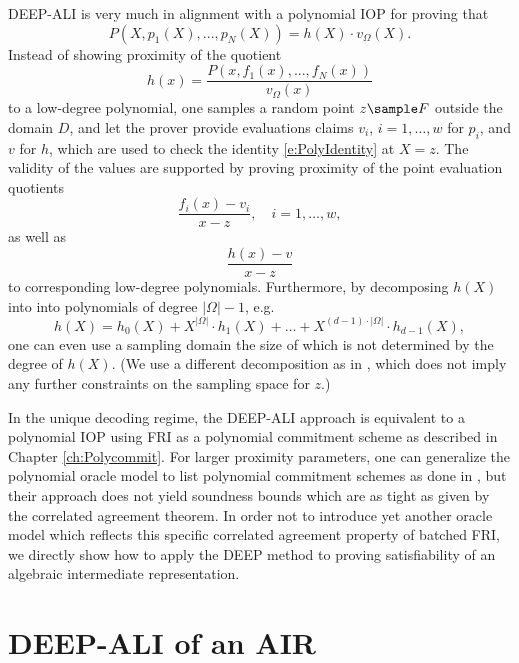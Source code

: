 \documentclass[11pt,article,oneside]{memoir}
\theoremstyle{definition}
\theoremstyle{remark}
\begin{document}
DEEP-ALI is very much in alignment with a polynomial IOP for proving that
\begin{equation}
\label{e:PolyIdentity}
P(X,p_1(X),..., p_N(X)) = h(X)\cdot v_\Omega(X). 
\end{equation}
Instead of showing proximity of the quotient
\[
h(x) = \frac{P(x,f_1(x),..., f_N(x))}{v_\Omega(x)}
\]
to a low-degree polynomial, one samples a random point $z\sample F$ outside the domain $D$, and let the prover provide evaluations claims $v_i$, $i=1,\ldots,w$ for $p_i$, and $v$ for $h$, which are used to check the identity \eqref{e:PolyIdentity} at $X=z$.
The validity of the values are supported by proving proximity of the point evaluation quotients
\[
\frac{f_i(x)-v_i}{x-z}, \quad i=1,\ldots ,w,
\]
as well as
\[
\frac{h(x)-v}{x-z}
\]
to corresponding low-degree polynomials.
Furthermore, by decomposing $h(X)$ into into polynomials of degree $|\Omega|-1$, e.g.
\begin{equation}
\label{e:SegmentPolys}
h(X)=h_0(X)+X^{|\Omega|}\cdot h_1(X)+ \ldots +X^{(d-1)\cdot |\Omega|}\cdot  h_{d-1}(X),
\end{equation}
one can even use a sampling domain the size of which is not determined by the degree of $h(X)$. 
(We use a different decomposition as in \cite{DEEPFRI, ethSTARK}, which does not imply any further constraints on the sampling space for $z$.)

In the unique decoding regime, the DEEP-ALI approach is equivalent to a polynomial IOP using FRI as a polynomial commitment scheme as described in Chapter \ref{ch:Polycommit}. 
For larger proximity parameters, one can generalize the polynomial oracle model to list polynomial commitment schemes as done in \cite{Redshift}, but their approach does not yield soundness bounds which are as tight as given by the correlated agreement theorem. 
In order not to introduce yet another oracle model which reflects this specific correlated agreement property of batched FRI, we directly show how to apply the DEEP method to proving satisfiability of an algebraic intermediate representation.


\section{DEEP-ALI of an AIR}
\end{document}

